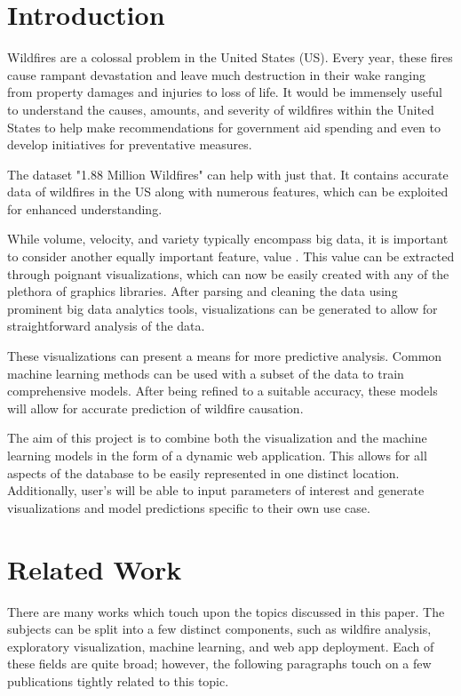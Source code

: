 \documentclass[conference]{IEEEtran}
\begin{document}
\section{Introduction}
Wildfires are a colossal problem in the United States (US). Every year, these fires cause rampant devastation and leave much destruction in their wake ranging from property damages and injuries to loss of life. It would be immensely useful to understand the causes, amounts, and severity of wildfires within the United States to help make recommendations for government aid spending and even to develop initiatives for preventative measures. \par

The dataset "1.88 Million Wildfires" can help with just that. It contains accurate data of wildfires in the US along with numerous features, which can be exploited for enhanced understanding. \par

While volume, velocity, and variety typically encompass big data, it is important to consider another equally important feature, value \cite{DBLP:journals/corr/abs-1709-07493}. This value can be extracted through poignant visualizations, which can now be easily created with any of the plethora of graphics libraries. After parsing and cleaning the data using prominent big data analytics tools, visualizations can be generated to allow for straightforward analysis of the data. \par

These visualizations can present a means for more predictive analysis. Common machine learning methods can be used with a subset of the data to train comprehensive models. After being refined to a suitable accuracy, these models will allow for accurate prediction of wildfire causation. \par

The aim of this project is to combine both the visualization and the machine learning models in the form of a dynamic web application. This allows for all aspects of the database to be easily represented in one distinct location. Additionally, user's will be able to input parameters of interest and generate visualizations and model predictions specific to their own use case. \par

\section{Related Work}
There are many works which touch upon the topics discussed in this paper. The subjects can be split into a few distinct components, such as wildfire analysis, exploratory visualization, machine learning, and web app deployment. Each of these fields are quite broad; however, the following paragraphs touch on a few publications tightly related to this topic. \par
\end{document}
